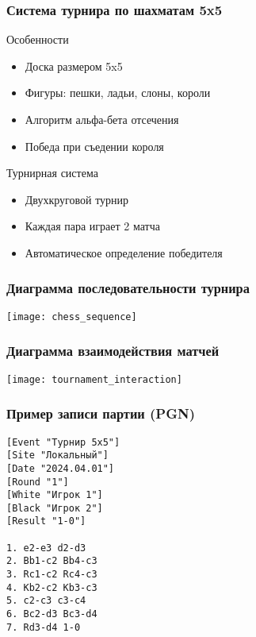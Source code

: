 \documentclass[14pt]{beamer}
\begin{document}
\begin{frame}
\frametitle{Система турнира по шахматам 5x5}
\begin{block}{Особенности}
\begin{itemize}
\item Доска размером 5x5
\item Фигуры: пешки, ладьи, слоны, короли
\item Алгоритм альфа-бета отсечения
\item Победа при съедении короля
\end{itemize}
\end{block}

\begin{block}{Турнирная система}
\begin{itemize}
\item Двухкруговой турнир
\item Каждая пара играет 2 матча
\item Автоматическое определение победителя
\end{itemize}
\end{block}
\end{frame}

\begin{frame}
\frametitle{Диаграмма последовательности турнира}
\begin{center}
\texttt{[image: chess\_sequence]}
\end{center}
\end{frame}

\begin{frame}
\frametitle{Диаграмма взаимодействия матчей}
\begin{center}
\texttt{[image: tournament\_interaction]}
\end{center}
\end{frame}

\begin{frame}[fragile]
\frametitle{Пример записи партии (PGN)}
\begin{lstlisting}
[Event "Турнир 5x5"]
[Site "Локальный"]
[Date "2024.04.01"]
[Round "1"]
[White "Игрок 1"]
[Black "Игрок 2"]
[Result "1-0"]

1. e2-e3 d2-d3
2. Bb1-c2 Bb4-c3
3. Rc1-c2 Rc4-c3
4. Kb2-c2 Kb3-c3
5. c2-c3 c3-c4
6. Bc2-d3 Bc3-d4
7. Rd3-d4 1-0
\end{lstlisting}
\end{frame}
\end{document}
